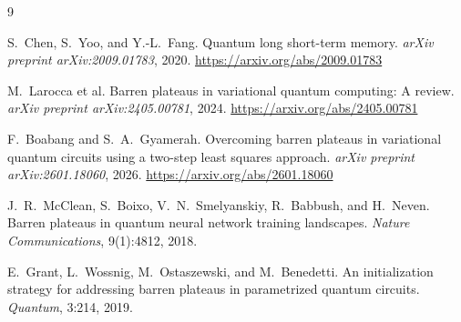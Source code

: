 \documentclass[11pt,a4paper]{article}
\begin{document}
\begin{thebibliography}{9}
\small

S.\ Chen, S.\ Yoo, and Y.-L.\ Fang.
\newblock Quantum long short-term memory.
\newblock \emph{arXiv preprint arXiv:2009.01783}, 2020.
\newblock \url{https://arxiv.org/abs/2009.01783}

M.\ Larocca et al.
\newblock Barren plateaus in variational quantum computing: A review.
\newblock \emph{arXiv preprint arXiv:2405.00781}, 2024.
\newblock \url{https://arxiv.org/abs/2405.00781}

F.\ Boabang and S.\ A.\ Gyamerah.
\newblock Overcoming barren plateaus in variational quantum circuits using a two-step least squares approach.
\newblock \emph{arXiv preprint arXiv:2601.18060}, 2026.
\newblock \url{https://arxiv.org/abs/2601.18060}

J.\ R.\ McClean, S.\ Boixo, V.\ N.\ Smelyanskiy, R.\ Babbush, and H.\ Neven.
\newblock Barren plateaus in quantum neural network training landscapes.
\newblock \emph{Nature Communications}, 9(1):4812, 2018.

E.\ Grant, L.\ Wossnig, M.\ Ostaszewski, and M.\ Benedetti.
\newblock An initialization strategy for addressing barren plateaus in parametrized quantum circuits.
\newblock \emph{Quantum}, 3:214, 2019.

\end{thebibliography}
\end{document}
